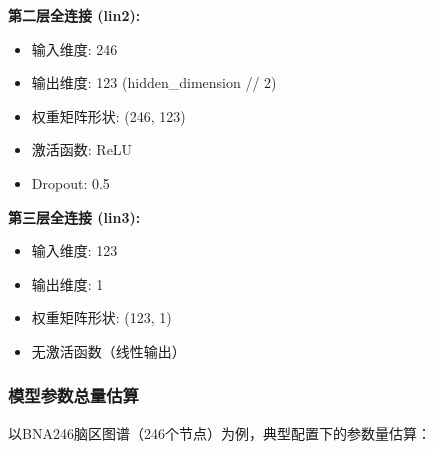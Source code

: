 \documentclass[UTF8, a4paper, 12pt]{article}
\begin{document}
\textbf{第二层全连接 (lin2):}
\begin{itemize}
    \item 输入维度: 246
    \item 输出维度: 123 (hidden\_dimension // 2)
    \item 权重矩阵形状: (246, 123)
    \item 激活函数: ReLU
    \item Dropout: 0.5
\end{itemize}

\textbf{第三层全连接 (lin3):}
\begin{itemize}
    \item 输入维度: 123
    \item 输出维度: 1
    \item 权重矩阵形状: (123, 1)
    \item 无激活函数（线性输出）
\end{itemize}

\subsubsection{模型参数总量估算}

以BNA246脑区图谱（246个节点）为例，典型配置下的参数量估算：
\end{document}
